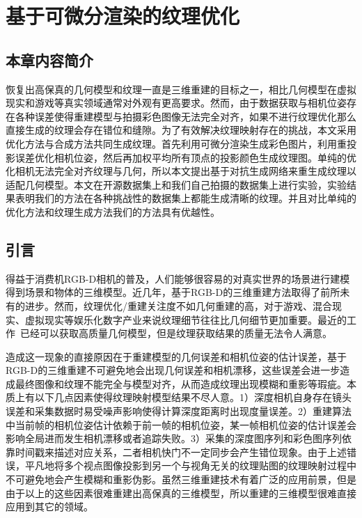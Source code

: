 \chapter{基于可微分渲染的纹理优化}
\section{本章内容简介}

恢复出高保真的几何模型和纹理一直是三维重建的目标之一，相比几何模型在虚拟现实和游戏等真实领域通常对外观有更高要求。然而，由于数据获取与相机位姿存在各种误差使得重建模型与拍摄彩色图像无法完全对齐，如果不进行纹理优化那么直接生成的纹理会存在错位和缝隙。为了有效解决纹理映射存在的挑战，本文采用优化方法与合成方法共同生成纹理。首先利用可微分渲染生成彩色图片，利用重投影误差优化相机位姿，然后再加权平均所有顶点的投影颜色生成纹理图。单纯的优化相机无法完全对齐纹理与几何，所以本文提出基于对抗生成网络来重生成纹理以适配几何模型。本文在开源数据集上和我们自己拍摄的数据集上进行实验，实验结果表明我们的方法在各种挑战性的数据集上都能生成清晰的纹理。并且对比单纯的优化方法和纹理生成方法我们的方法具有优越性。
\section{引言}


得益于消费机RGB-D相机的普及，人们能够很容易的对真实世界的场景进行建模得到场景和物体的三维模型。近几年，基于RGB-D的三维重建方法取得了前所未有的进步。然而，纹理优化/重建关注度不如几何重建的高，对于游戏、混合现实、虚拟现实等娱乐化数字产业来说纹理细节往往比几何细节更加重要。最近的工作~\cite{RichardNewcombe2011KinectFusionRD,ThomasWhelan2012KintinuousSE,ThomasWhelan2015ElasticFusionDS,SungjoonChoi2015RobustRO,VictorAdrianPrisacariu2017InfiniTAMVA,niessner2013real}已经可以获取高质量几何模型，但是纹理获取结果的质量无法令人满意。\par


造成这一现象的直接原因在于重建模型的几何误差和相机位姿的估计误差，基于RGB-D的三维重建不可避免地会出现几何误差和相机漂移，这些误差会进一步造成最终图像和纹理不能完全与模型对齐，从而造成纹理出现模糊和重影等瑕疵。本质上有以下几点因素使得纹理映射模型结果不尽人意。1）深度相机自身存在镜头误差和采集数据时易受噪声影响使得计算深度距离时出现度量误差。2）重建算法中当前帧的相机位姿估计依赖于前一帧的相机位姿，某一帧相机位姿的估计误差会影响全局进而发生相机漂移或者追踪失败。3）采集的深度图序列和彩色图序列依靠时间戳来描述对应关系，二者相机快门不一定同步会产生错位现象。由于上述错误，平凡地将多个视点图像投影到另一个与视角无关的纹理贴图的纹理映射过程中不可避免地会产生模糊和重影伪影。虽然三维重建技术有着广泛的应用前景，但是由于以上的这些因素很难重建出高保真的三维模型，所以重建的三维模型很难直接应用到其它的领域。\par

